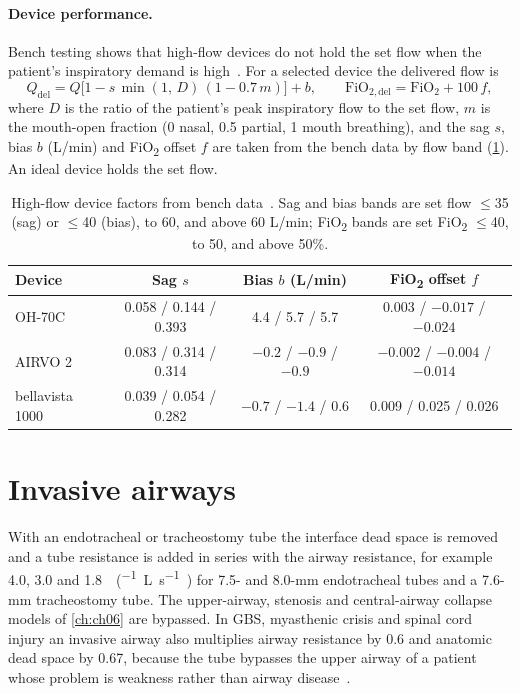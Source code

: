 \paragraph{Device performance.} Bench testing shows that high-flow devices do not hold the set flow when the patient's inspiratory demand is high~\citep{sun2021}. For a selected device the delivered flow is
\begin{equation}
Q_{\mathrm{del}}=Q\bigl[1-s\,\min(1,\,D)\,(1-0.7\,m)\bigr]+b,\qquad \mathrm{FiO_{2,del}}=\mathrm{FiO_2}+100\,f,
\label{eq:modes-hfdev}
\end{equation}
where $D$ is the ratio of the patient's peak inspiratory flow to the set flow, $m$ is the mouth-open fraction (0 nasal, 0.5 partial, 1 mouth breathing), and the sag $s$, bias $b$ (L/min) and FiO\textsubscript{2} offset $f$ are taken from the bench data by flow band (\cref{tab:modes-hfdev}). An ideal device holds the set flow.

\begin{table}[ht]
\centering
\caption{High-flow device factors from bench data~\citep{sun2021}. Sag and bias bands are set flow $\le$35 (sag) or $\le$40 (bias), to 60, and above 60 L/min; FiO\textsubscript{2} bands are set FiO\textsubscript{2} $\le$40, to 50, and above 50\%.}
\label{tab:modes-hfdev}
\begin{tabular}{lccc}
\toprule
Device & Sag $s$ & Bias $b$ (L/min) & FiO\textsubscript{2} offset $f$\\
\midrule
OH-70C & 0.058 / 0.144 / 0.393 & 4.4 / 5.7 / 5.7 & 0.003 / $-0.017$ / $-0.024$\\
AIRVO 2 & 0.083 / 0.314 / 0.314 & $-0.2$ / $-0.9$ / $-0.9$ & $-0.002$ / $-0.004$ / $-0.014$\\
bellavista 1000 & 0.039 / 0.054 / 0.282 & $-0.7$ / $-1.4$ / 0.6 & 0.009 / 0.025 / 0.026\\
\bottomrule
\end{tabular}
\end{table}

\section{Invasive airways}
\label{sec:modes-tubes}
With an endotracheal or tracheostomy tube the interface dead space is removed and a tube resistance is added in series with the airway resistance, for example \num{4.0}, \num{3.0} and \SI{1.8}{\cmH\per(\liter\per\second)} for 7.5- and 8.0-mm endotracheal tubes and a 7.6-mm tracheostomy tube. The upper-airway, stenosis and central-airway collapse models of \cref{ch:ch06} are bypassed. In GBS, myasthenic crisis and spinal cord injury an invasive airway also multiplies airway resistance by 0.6 and anatomic dead space by 0.67, because the tube bypasses the upper airway of a patient whose problem is weakness rather than airway disease~\citep{brown2006}.

